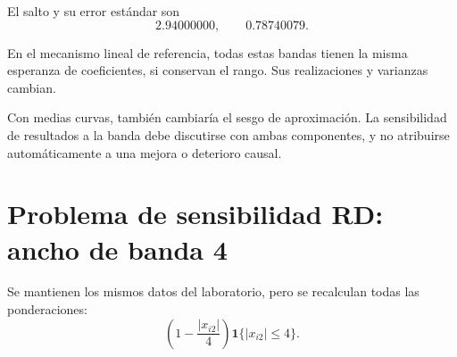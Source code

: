 \documentclass[11pt,a4paper]{article}
\begin{document}
El salto y su error estándar son
\[
2.94000000,\qquad 0.78740079.
\]

En el mecanismo lineal de referencia,
todas estas bandas tienen la misma
esperanza de coeficientes,
si conservan el rango.
Sus realizaciones y varianzas cambian.

Con medias curvas, también cambiaría
el sesgo de aproximación.
La sensibilidad de resultados a la banda
debe discutirse con ambas componentes,
y no atribuirse automáticamente
a una mejora o deterioro causal.

\clearpage
\section{Problema de sensibilidad RD: ancho de banda 4}\label{unidad59}
Se mantienen los mismos datos del laboratorio,
pero se recalculan todas las ponderaciones:
\[
\left(1-\frac{|x_{i2}|}{4}\right)
\mathbf1\{|x_{i2}|\le4\}.
\]
\end{document}
